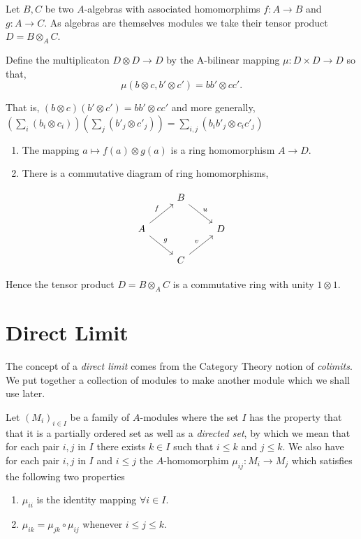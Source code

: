 \documentclass[]{report}
\begin{document}
Let $B,C$ be two $A$-algebras with associated homomorphims $f:A\rightarrow B$ and $g:A\rightarrow C$. As algebras are themselves modules we take their tensor product $D = B\otimes_A C$. 

Define the multiplicaton $D\otimes D \rightarrow D$ by the A-bilinear mapping $\mu: D\times D \rightarrow D$ so that,
$$\mu(b\otimes c, b'\otimes c') = bb' \otimes cc'. $$


That is, $(b\otimes c)(b'\otimes c') = bb'\otimes cc'$ and more generally, $(\sum_i(b_i\otimes c_i))(\sum_j(b'_j\otimes c'_j)) = \sum_{i,j}(b_i b'_j \otimes c_i c'_j)$
\begin{enumerate}
    \item The mapping $a\mapsto f(a)\otimes g(a)$ is a ring homomorphism $A\rightarrow D$. 
    \item There is a commutative diagram of ring homomorphisms, 
\end{enumerate}

\begin{equation*}
    \begin{tikzcd}
                                  & B \arrow[rd, "u"] &   \\
        A \arrow[ru, "f"] \arrow[rd, "g"] &                   & D \\
                                  & C \arrow[ru, "v"] &  
    \end{tikzcd}
\end{equation*}

Hence the tensor product $D = B \otimes_A C$ is a commutative ring with unity $1 \otimes 1$.

\section{Direct Limit}

The concept of a \textit{direct limit} comes from the Category Theory notion of \textit{colimits}. We put together a collection of modules to make another module which we shall use later.

Let $(M_i)_{i\in I}$ be a family of $A$-modules where the set $I$ has the property that that it is a partially ordered set as well as a \textit{directed set}, by which we mean that for each pair $i,j$ in $I$ there exists $k\in I$ such that $i\leq k$ and $j\leq k$. We also have for each pair $i,j$ in $I$ and $i\leq j$ the $A$-homomorphim $\mu_{ij}: M_i \rightarrow M_j$ which satisfies the following two properties
\begin{enumerate}
    \item $\mu_{ii}$ is the identity mapping $\forall i\in I$.
    \item $\mu_{ik} = \mu_{jk}\circ \mu_{ij}$ whenever $i\leq j\leq k$.
\end{enumerate}
\end{document}
